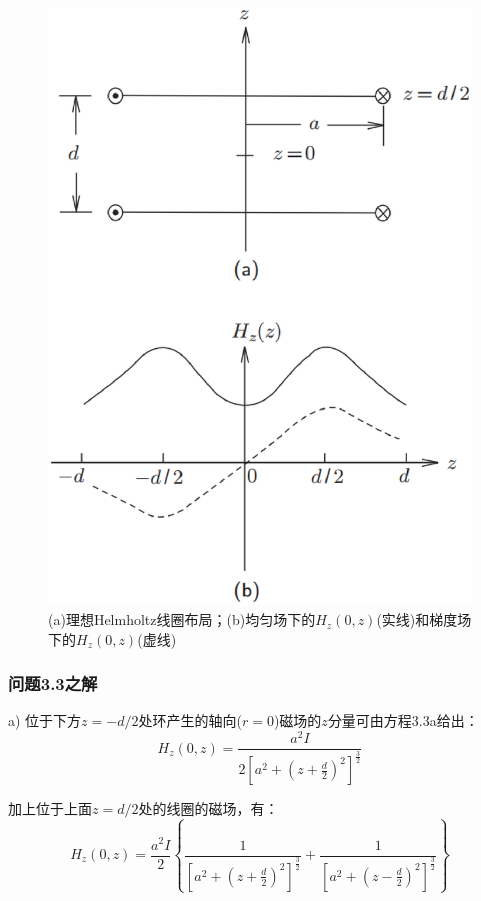 \begin{figure}[htbp]
	\centering
	\includegraphics[scale=0.4]{chpt3/figs/fig3.24.eps}
	\caption{(a)理想Helmholtz线圈布局；(b)均匀场下的$H_z(0,z)$(实线)和梯度场下的$H_z(0,z)$(虚线)}
\end{figure}

\subsubsection{问题3.3之解}
a) 位于下方$z=−d/2$处环产生的轴向($r =0$)磁场的$z$分量可由方程3.3a给出：
\begin{equation}%
H_z(0,z)=\frac{a^2I}{2[a^2+(z+\frac{d}{2})^2]^\frac{3}{2}}
\end{equation}

加上位于上面$z=d/2$处的线圈的磁场，有：
\begin{equation}%
H_z(0,z)=\frac{a^2I}{2}\left\{\frac{1}{[a^2+(z+\frac{d}{2})^2]^\frac{3}{2}}+\frac{1}{[a^2+(z-\frac{d}{2})^2]^\frac{3}{2}}\right\}
\end{equation}

